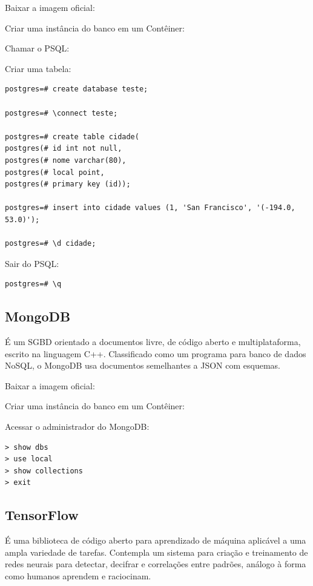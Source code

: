 \documentclass[a4paper,11pt]{article}
\begin{document}
Baixar a imagem oficial: \\

Criar uma instância do banco em um Contêiner: \\

Chamar o PSQL: \\

Criar uma tabela:
\begin{lstlisting}[]
postgres=# create database teste;

postgres=# \connect teste;

postgres=# create table cidade(
postgres(# id int not null,
postgres(# nome varchar(80),
postgres(# local point,
postgres(# primary key (id));

postgres=# insert into cidade values (1, 'San Francisco', '(-194.0, 53.0)');

postgres=# \d cidade;
\end{lstlisting}

Sair do PSQL:
\begin{lstlisting}[]
postgres=# \q
\end{lstlisting}

\subsection{MongoDB}
É um SGBD orientado a documentos livre, de código aberto e multiplataforma, escrito na linguagem C++. Classificado como um programa para banco de dados NoSQL, o MongoDB usa documentos semelhantes a JSON com esquemas. 

Baixar a imagem oficial: \\

Criar uma instância do banco em um Contêiner: \\

Acessar o administrador do MongoDB: \\
\begin{lstlisting}[]
> show dbs
> use local
> show collections
> exit
\end{lstlisting}

\subsection{TensorFlow}
É uma biblioteca de código aberto para aprendizado de máquina aplicável a uma ampla variedade de tarefas. Contempla um sistema para criação e treinamento de redes neurais para detectar, decifrar e correlações entre padrões, análogo à forma como humanos aprendem e raciocinam. 
\end{document}
